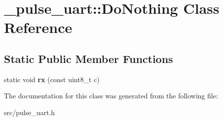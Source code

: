 \hypertarget{class__pulse__uart_1_1DoNothing}{}\section{\+\_\+pulse\+\_\+uart\+:\+:Do\+Nothing Class Reference}
\label{class__pulse__uart_1_1DoNothing}
\subsection*{Static Public Member Functions}
\begin{DoxyCompactItemize}
\item 
\hypertarget{class__pulse__uart_1_1DoNothing_aa2b42bd8f66520f547959dcbc564b4b0}{}\label{class__pulse__uart_1_1DoNothing_aa2b42bd8f66520f547959dcbc564b4b0} 
static void {\bfseries rx} (const uint8\+\_\+t c)
\end{DoxyCompactItemize}


The documentation for this class was generated from the following file\+:\begin{DoxyCompactItemize}
\item 
src/pulse\+\_\+uart.\+h\end{DoxyCompactItemize}
